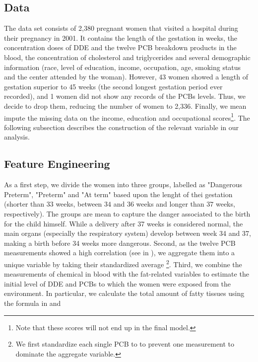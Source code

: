 \documentclass[10pt]{jmlr}%
\begin{document}
\subsection{Data}
\label{sec:data}
The data set consists of 2,380 pregnant women that visited a hospital during their pregnancy in 2001. It contains the length of the gestation in weeks, the concentration doses of DDE and the twelve PCB breakdown products in the blood, the concentration of cholesterol and triglycerides and several demographic information (race, level of education, income, occupation, age, smoking status and the center attended by the woman). However, 43 women showed a length of gestation superior to 45 weeks (the second longest gestation period ever recorded), and 1 women did not show any records of the PCBs levels. Thus, we decide to drop them, reducing the number of women to 2,336. Finally, we mean impute the missing data on the income, education and occupational scores\footnote{Note that these scores will not end up in the final model.}. The following subsection describes the construction of the relevant variable in our analysis.

\subsection{Feature Engineering}
\label{sec:feature}
As a first step, we divide the women into three groups, labelled as "Dangerous Preterm", "Preterm" and "At term" based upon the lenght of thei gestation (shorter than $33$ weeks, between $34$ and $36$ weeks and longer than $37$ weeks, respectively). The groups are mean to capture the danger associated to the birth for the child himself. While a delivery after 37 weeks is considered normal, the main organs (especially the respiratory system) develop between week 34 and 37, making a birth before 34 weeks more dangerous. Second, as the twelve PCB measurements showed a high correlation (see  in ), we aggregate them into a unique variable by taking their standardized average \footnote{We first standardize each single PCB to to prevent one measurement to dominate the aggregate variable.}. Third, we combine the measurements of chemical in blood with the fat-related variables to estimate the initial level of DDE and PCBs to which the women were exposed from the environment. In particular, we calculate the total amount of fatty tissues using the formula in \cite{Phillips1989} and \cite{Bernert2007}
\end{document}
